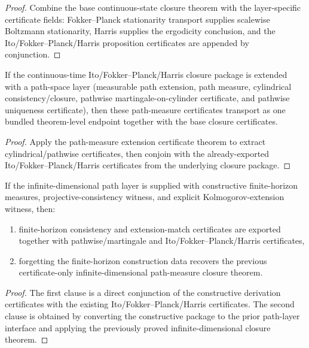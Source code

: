 \begin{proof}
Combine the base continuous-state closure theorem with the layer-specific certificate fields: Fokker--Planck stationarity transport supplies scalewise Boltzmann stationarity, Harris supplies the ergodicity conclusion, and the Ito/Fokker--Planck/Harris proposition certificates are appended by conjunction.
\end{proof}

\begin{theorem}\label{thm:langevin-infinite-dimensional-path-measure-bridge}
If the continuous-time Ito/Fokker--Planck/Harris closure package is extended with a path-space layer (measurable path extension, path measure, cylindrical consistency/closure, pathwise martingale-on-cylinder certificate, and pathwise uniqueness certificate), then these path-measure certificates transport as one bundled theorem-level endpoint together with the base closure certificates.
\end{theorem}

\begin{proof}
Apply the path-measure extension certificate theorem to extract cylindrical/pathwise certificates, then conjoin with the already-exported Ito/Fokker--Planck/Harris certificates from the underlying closure package.
\end{proof}

\begin{theorem}\label{thm:langevin-constructive-infinite-dimensional-path-derivation-bridge}
If the infinite-dimensional path layer is supplied with constructive finite-horizon measures, projective-consistency witness, and explicit Kolmogorov-extension witness, then:
\begin{enumerate}
\item finite-horizon consistency and extension-match certificates are exported together with pathwise/martingale and Ito/Fokker--Planck/Harris certificates,
\item forgetting the finite-horizon construction data recovers the previous certificate-only infinite-dimensional path-measure closure theorem.
\end{enumerate}
\end{theorem}

\begin{proof}
The first clause is a direct conjunction of the constructive derivation certificates with the existing Ito/Fokker--Planck/Harris certificates. The second clause is obtained by converting the constructive package to the prior path-layer interface and applying the previously proved infinite-dimensional closure theorem.
\end{proof}

